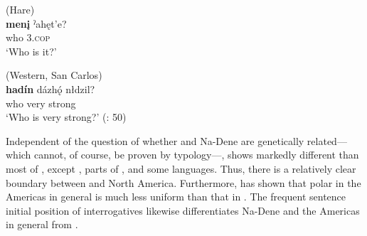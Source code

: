 \ea%
    \label{ex:yeni:20}
     (Hare)\\
    \gll \textbf{{men\k{i}}} ˀahęt’e?\\
    who    3.\textsc{cop}\\
    \glt ‘Who is it?’ \citep[1141]{Rice1989}
    \z

\ea%
    \label{ex:yeni:21}
     (Western, San Carlos)\\
    \gll \textbf{{hadín}} dázhǫ́ nłdzil?\\
    who  very  strong\\
    \glt ‘Who is very strong?’ (\citealt{deReuse2006}: 50)
    \z

Independent of the question of whether  and Na-Dene are genetically related---which cannot, of course, be proven by typology---,  shows markedly different  than most of , except , parts of , and some  languages. Thus, there is a relatively clear boundary between  and North America. Furthermore, \citet{Dryer2013k} has shown that polar  in the Americas in general is much less uniform than that in . The frequent sentence initial position of interrogatives likewise differentiates Na-Dene and the Americas in general from  \citep{Dryer2013l}.

\clearpage %
